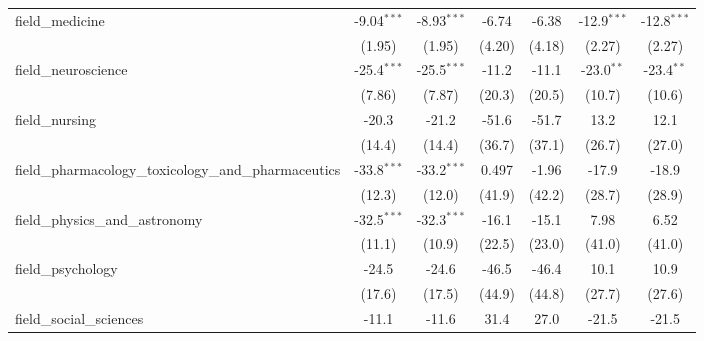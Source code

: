 \begin{tabular}{lcccccc}
   field\_medicine                                             & -9.04$^{***}$  & -8.93$^{***}$  & -6.74          & -6.38          & -12.9$^{***}$ & -12.8$^{***}$\\   
                                                               & (1.95)         & (1.95)         & (4.20)         & (4.18)         & (2.27)        & (2.27)\\   
   field\_neuroscience                                         & -25.4$^{***}$  & -25.5$^{***}$  & -11.2          & -11.1          & -23.0$^{**}$  & -23.4$^{**}$\\   
                                                               & (7.86)         & (7.87)         & (20.3)         & (20.5)         & (10.7)        & (10.6)\\   
   field\_nursing                                              & -20.3          & -21.2          & -51.6          & -51.7          & 13.2          & 12.1\\   
                                                               & (14.4)         & (14.4)         & (36.7)         & (37.1)         & (26.7)        & (27.0)\\   
   field\_pharmacology\_toxicology\_and\_pharmaceutics         & -33.8$^{***}$  & -33.2$^{***}$  & 0.497          & -1.96          & -17.9         & -18.9\\   
                                                               & (12.3)         & (12.0)         & (41.9)         & (42.2)         & (28.7)        & (28.9)\\   
   field\_physics\_and\_astronomy                              & -32.5$^{***}$  & -32.3$^{***}$  & -16.1          & -15.1          & 7.98          & 6.52\\   
                                                               & (11.1)         & (10.9)         & (22.5)         & (23.0)         & (41.0)        & (41.0)\\   
   field\_psychology                                           & -24.5          & -24.6          & -46.5          & -46.4          & 10.1          & 10.9\\   
                                                               & (17.6)         & (17.5)         & (44.9)         & (44.8)         & (27.7)        & (27.6)\\   
   field\_social\_sciences                                     & -11.1          & -11.6          & 31.4           & 27.0           & -21.5         & -21.5\\   

\end{tabular}
